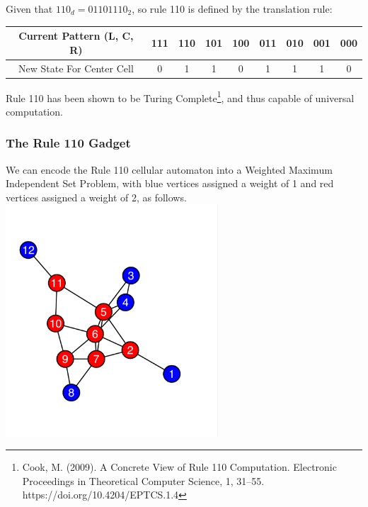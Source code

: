 \documentclass[twocolumn,superscriptaddress,english,showpacs,longbibliography]{revtex4-2}
\begin{document}
Given that $110_d = 01101110_2$, so rule 110 is defined by the
translation rule:

\begin{tabular}{|c|c|c|c|c|c|c|c|c|}
\hline
Current Pattern (L, C, R) & 111 & 110 & 101 & 100 & 011 & 010 & 001 & 000 \\
\hline
New State For Center Cell & 0 & 1 & 1 & 0 & 1 & 1 & 1 & 0 \\
\hline
\end{tabular}

Rule 110 has been shown to be Turing Complete\footnote{Cook, M. (2009).
  A Concrete View of Rule 110 Computation. Electronic Proceedings in
  Theoretical Computer Science, 1, 31--55.
  https://doi.org/10.4204/EPTCS.1.4}, and thus capable of universal
computation.

\subsubsection{The Rule 110 Gadget}\label{the-rule-110-gadget}

We can encode the Rule 110 cellular automaton into a Weighted Maximum
Independent Set Problem, with blue vertices assigned a weight of 1 and
red vertices assigned a weight of 2, as follows.
\includegraphics[width=3.125in,height=\textheight,keepaspectratio]{../notes/images/image.png}
\end{document}

